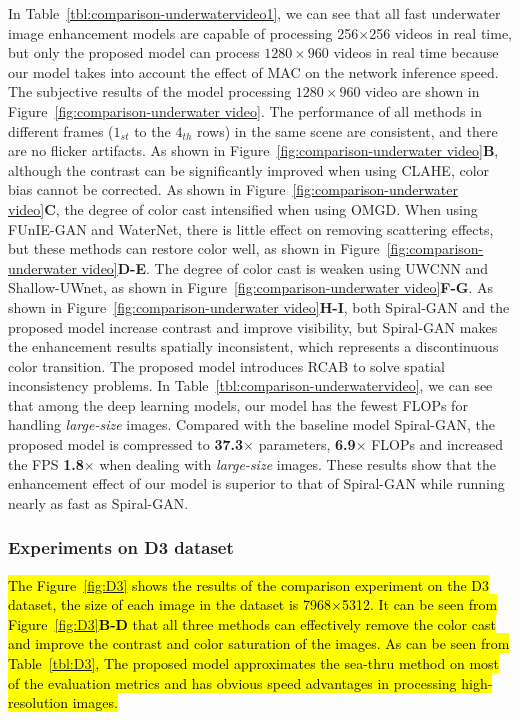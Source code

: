 \documentclass[utf8]{FrontiersinHarvard} %
\begin{document}
In Table~\ref{tbl:comparison-underwatervideo1}, we can see that all fast underwater image enhancement models are capable of processing 256$\times$256 videos in real time, but only the proposed model can process $1280\times960$ videos in real time because our model takes into account the effect of MAC on the network inference speed. The subjective results of the model processing $1280\times960$ video are shown in Figure~\ref{fig:comparison-underwater video}. The performance of all methods in different frames ($1_{st}$ to the $4_{th}$ rows) in the same scene are consistent, and there are no flicker artifacts. As shown in Figure~\ref{fig:comparison-underwater video}\textbf{B}, although the contrast can be significantly improved when using CLAHE, color bias cannot be corrected. As shown in Figure~\ref{fig:comparison-underwater video}\textbf{C}, the degree of color cast intensified when using OMGD. When using FUnIE-GAN and WaterNet, there is little effect on removing scattering effects, but these methods can restore color well, as shown in Figure~\ref{fig:comparison-underwater video}\textbf{D-E}. The degree of color cast is weaken using UWCNN and Shallow-UWnet, as shown in Figure~\ref{fig:comparison-underwater video}\textbf{F-G}. As shown in Figure~\ref{fig:comparison-underwater video}\textbf{H-I}, both Spiral-GAN and the proposed model increase contrast and improve visibility, but Spiral-GAN makes the enhancement results spatially inconsistent, which represents a discontinuous color transition. The proposed model introduces RCAB to solve spatial inconsistency problems. In Table~\ref{tbl:comparison-underwatervideo}, we can see that among the deep learning models, our model has the fewest FLOPs for handling \textit{large-size} images. Compared with the baseline model Spiral-GAN, the proposed model is compressed to \textbf{37.3}$\times$ parameters, \textbf{6.9}$\times$ FLOPs and increased the FPS \textbf{1.8}$\times$ when dealing with \textit{large-size} images. These results show that the enhancement effect of our model is superior to that of Spiral-GAN while running nearly as fast as Spiral-GAN.

\subsubsection{Experiments on D3 dataset}
\hl{The Figure~\ref{fig:D3} shows the results of the comparison experiment on the D3 dataset, the size of each image in the dataset is 7968$\times$5312. It can be seen from Figure~\ref{fig:D3}\textbf{B-D} that all three methods can effectively remove the color cast and improve the contrast and color saturation of the images. As can be seen from Table~\ref{tbl:D3}, The proposed model approximates the sea-thru method on most of the evaluation metrics and has obvious speed advantages in processing high-resolution images.}
\end{document}
